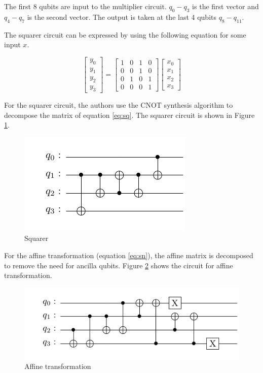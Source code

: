 \documentclass[preprint]{transcrypto}
\begin{document}
The first 8 qubits are input to the multiplier circuit. $q_0 - q_3$ is the first vector and $q_4 - q_7$ is the second vector. The output is taken at the last 4 qubits $q_8 - q_{11}$.

The squarer circuit can be expressed by using the following equation for some input $x$.

\begin{equation}\label{eq:sq}
    \begin{bmatrix}
    y_0\\
    y_1\\ 
    y_2\\
    y_3
    \end{bmatrix} = 
    \begin{bmatrix}
    1 & 0 & 1 & 0\\
    0 & 0 & 1 & 0 \\
    0 & 1 & 0 & 1 \\
    0 & 0 & 0 & 1
    \end{bmatrix} 
    \begin{bmatrix}
    x_0 \\ x_1\\
    x_2 \\ x_3
    \end{bmatrix}
\end{equation}

For the squarer circuit, the authors use the CNOT synthesis algorithm to decompose the matrix of equation \ref{eq:sq}. The squarer circuit is shown in Figure \ref{fig:sq}.

\begin{figure}[h!]
    \centering
    \includegraphics[width=0.5\linewidth]{saes18/squarer.pdf}
    \caption{Squarer}
    \label{fig:sq}
\end{figure}

For the affine transformation (equation \ref{eq:sn}), the affine matrix is decomposed to remove the need for ancilla qubits. Figure \ref{fig:aff} shows the circuit for affine transformation.

\begin{figure}[h!]
    \centering
    \includegraphics[width=0.8\linewidth]{saes18/affine.pdf}
    \caption{Affine transformation}
    \label{fig:aff}
\end{figure}
\end{document}
